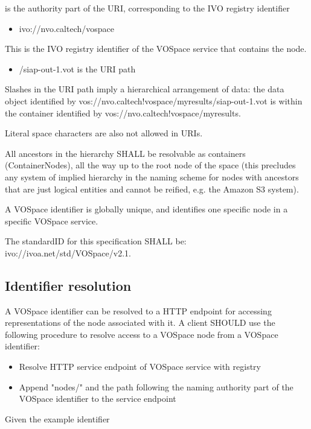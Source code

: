 \documentclass[11pt,a4paper]{ivoa}
\begin{document}
is the authority part of the URI, corresponding to the IVO registry identifier

\begin{itemize}
    \item ivo://nvo.caltech/vospace
\end{itemize}

This is the IVO registry identifier of the VOSpace service that contains the node.

\begin{itemize}
    \item /siap-out-1.vot is the URI path
\end{itemize}

Slashes in the URI path imply a hierarchical arrangement of data: the data object identified by vos://nvo.caltech!vospace/myresults/siap-out-1.vot is within the container identified by vos://nvo.caltech!vospace/myresults.

Literal space characters are also not allowed in URIs.

All ancestors in the hierarchy SHALL be resolvable as containers (ContainerNodes), all the way up to the root node of the space (this precludes any system of implied hierarchy in the naming scheme for nodes with ancestors that are just logical entities and cannot be reified, e.g. the Amazon S3 system).

A VOSpace identifier is globally unique, and identifies one specific node in a specific VOSpace service.

The standardID for this specification SHALL be: ivo://ivoa.net/std/VOSpace/v2.1.

\subsection{Identifier resolution}
A VOSpace identifier can be resolved to a HTTP endpoint for accessing representations of the node associated with it. A client SHOULD use the following procedure to resolve access to a VOSpace node from a VOSpace identifier:

\begin{itemize}
    \item Resolve HTTP service endpoint of VOSpace service with registry
    \item Append "nodes/" and the path following the naming authority part of the VOSpace identifier to the service endpoint
\end{itemize}

Given the example identifier
\end{document}
